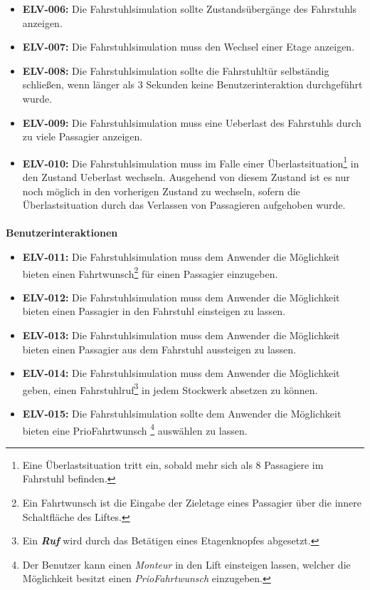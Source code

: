 \newpage
\begin{itemize}
	\item \textbf{ELV-006:} \newline
		Die \gls{Fahrstuhlsimulation} sollte Zustandsübergänge des Fahrstuhls anzeigen.
	\item \textbf{ELV-007:} \newline
		Die \gls{Fahrstuhlsimulation} muss den Wechsel einer Etage anzeigen.
	\item \textbf{ELV-008:} \newline
		Die \gls{Fahrstuhlsimulation} sollte die Fahrstuhltür selbständig schließen, wenn 
		länger als 3 Sekunden keine Benutzerinteraktion durchgeführt wurde.
	\item \textbf{ELV-009:} \newline
		Die \gls{Fahrstuhlsimulation} muss eine \gls{Ueberlast} des Fahrstuhls durch zu 
		viele \gls{Passagier} anzeigen.
	\item \textbf{ELV-010:} \newline
		Die \gls{Fahrstuhlsimulation} muss im Falle einer Überlastsituation\footnote{Eine Überlastsituation tritt ein, sobald mehr sich als 8 Passagiere im Fahrstuhl befinden.} in den Zustand \gls{Ueberlast} wechseln. Ausgehend von diesem Zustand  ist es nur noch möglich in den vorherigen Zustand zu wechseln, sofern die Überlastsituation durch das Verlassen von Passagieren aufgehoben wurde.
\end{itemize}

\newpage
\paragraph{}
\textbf{Benutzerinteraktionen}
\begin{itemize}
	\item \textbf{ELV-011:}
		Die \gls{Fahrstuhlsimulation} muss dem Anwender die Möglichkeit bieten einen \gls{Fahrtwunsch}\footnote{Ein \gls{Fahrtwunsch} ist die Eingabe der Zieletage eines \gls{Passagier} über die innere Schaltfläche des Liftes.} für einen \gls{Passagier} einzugeben.
	\item \textbf{ELV-012:}
		Die \gls{Fahrstuhlsimulation} muss dem Anwender die Möglichkeit bieten einen \gls{Passagier} in den Fahrstuhl einsteigen zu lassen.
	\item \textbf{ELV-013:}
		Die \gls{Fahrstuhlsimulation} muss dem Anwender die Möglichkeit bieten einen \gls{Passagier} aus dem Fahrstuhl aussteigen zu lassen.
	\item \textbf{ELV-014:}
		Die \gls{Fahrstuhlsimulation} muss dem Anwender die Möglichkeit geben, einen \gls{Fahrstuhlruf}\footnote{Ein \textbf{\textit{Ruf}} wird durch das Betätigen eines Etagenknopfes abgesetzt.} in jedem Stockwerk absetzen zu können.
	\item \textbf{ELV-015:}
		Die \gls{Fahrstuhlsimulation} sollte dem Anwender die Möglichkeit bieten eine \gls{PrioFahrtwunsch} \footnote{Der Benutzer kann einen \textit{\gls{Monteur}} in den Lift einsteigen lassen, welcher die Möglichkeit besitzt einen \textit{\gls{PrioFahrtwunsch}} einzugeben.} auswählen zu lassen.
\end{itemize}

